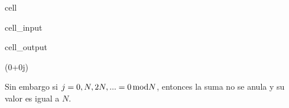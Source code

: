 \documentclass[letterpaper,10pt,english]{jupyterBook}
\begin{document}
\begin{sphinxuseclass}{cell}
\begin{sphinxVerbatimInput}
\begin{sphinxuseclass}{cell_input}
\end{sphinxuseclass}\end{sphinxVerbatimInput}
\begin{sphinxVerbatimOutput}

\begin{sphinxuseclass}{cell_output}
\begin{sphinxVerbatim}[commandchars=\\\{\}]
(\PYGZhy{}0+0j)
\end{sphinxVerbatim}

\noindent{}

\end{sphinxuseclass}\end{sphinxVerbatimOutput}

\end{sphinxuseclass}
\sphinxAtStartPar
Sin embargo si \(j = 0, N, 2N,... = 0\,\hbox{mod} N\), entonces la suma no se anula y su valor es igual a \(N\).
\end{document}
